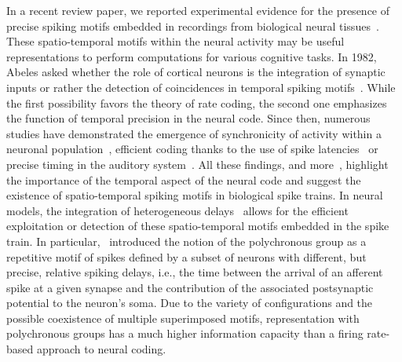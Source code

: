 \documentclass[default]{sn-jnl}%
\theoremstyle{thmstyleone}%
\theoremstyle{thmstyletwo}%
\theoremstyle{thmstylethree}%
\begin{document}
In a recent review paper, we reported experimental evidence for the presence of precise spiking motifs embedded in recordings from biological neural tissues~\cite{grimaldi_precise_2023}. These spatio-temporal motifs within the neural activity may be useful representations to perform computations for various cognitive tasks. In 1982, Abeles asked whether the role of cortical neurons is the integration of synaptic inputs or rather the detection of coincidences in temporal spiking motifs~\citep{abeles_role_1982}. While the first possibility favors the theory of rate coding, the second one emphasizes the function of temporal precision in the neural code. Since then, numerous studies have demonstrated the emergence of synchronicity of activity within a neuronal population~\citep{riehle_spike_1997, davis_spontaneous_2021}, efficient coding thanks to the use of spike latencies~\citep{perrinet_coding_2004, gollisch_rapid_2008} or precise timing in the auditory system~\citep{deweese_binary_2002, carr_circuit_1990}. All these findings, and more~\citep{bohte_evidence_2004}, highlight the importance of the temporal aspect of the neural code and suggest the existence of spatio-temporal spiking motifs in biological spike trains. In neural models, the integration of heterogeneous delays~\citep{guise_bayesian_2014, zhang_supervised_2020, nadafian_bio-plausible_2020} allows for the efficient exploitation or detection of these spatio-temporal motifs embedded in the spike train. In particular,~\citet{izhikevich_polychronization_2006} introduced the notion of the polychronous group as a repetitive motif of spikes defined by a subset of neurons with different, but precise, relative spiking delays, i.e., the time between the arrival of an afferent spike at a given synapse and the contribution of the associated postsynaptic potential to the neuron's soma. Due to the variety of configurations and the possible coexistence of multiple superimposed motifs, representation with polychronous groups has a much higher information capacity than a firing rate-based approach to neural coding.
\end{document}

